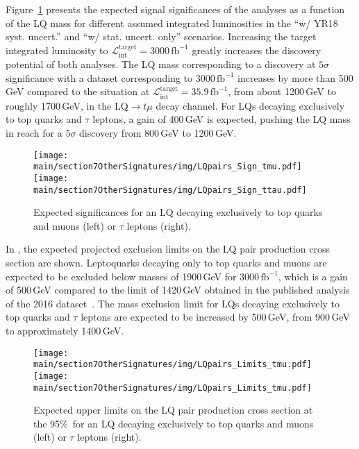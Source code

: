 Figure~\ref{fig:LQpairs:significances} presents the expected signal significances of the analyses as a function of the LQ mass for different assumed integrated luminosities in the ``w/ YR18 syst. uncert.'' and ``w/ stat. uncert. only'' scenarios. Increasing the target integrated luminosity to $\mathcal{L}_{\text{int}}^{\text{target}} = 3000\,\mathrm{fb}^{-1}$ greatly increases the discovery potential of both analyses. The LQ mass corresponding to a discovery at $5\sigma$ significance with a dataset corresponding to $3000\,\mathrm{fb}^{-1}$ increases by more than 500\,GeV compared to the situation at $\mathcal{L}_{\text{int}}^{\text{target}} = 35.9\,\mathrm{fb}^{-1}$, from about 1200\,GeV to roughly 1700\,GeV, in the $\text{LQ}\rightarrow t\mu$ decay channel. For LQs decaying exclusively to top quarks and $\tau$ leptons, a gain of 400\,GeV is expected, pushing the LQ mass in reach for a $5\sigma$ discovery from 800\,GeV to 1200\,GeV. 

\begin{figure}[t]
\centering
\texttt{[image: \\main/section7OtherSignatures/img/LQpairs\_Sign\_tmu.pdf]}
\texttt{[image: \\main/section7OtherSignatures/img/LQpairs\_Sign\_ttau.pdf]}
\caption{Expected significances for an LQ decaying exclusively to top quarks and muons (left) or $\tau$ leptons (right).}
\label{fig:LQpairs:significances}
\end{figure}

In , the expected projected exclusion limits on the LQ pair production cross section are shown. Leptoquarks decaying only to top quarks and muons are expected to be excluded below masses of 1900\,GeV for $3000\,\mathrm{fb}^{-1}$, which is a gain of 500\,GeV compared to the limit of 1420\,GeV obtained in the published analysis of the 2016 dataset~\cite{Sirunyan:2018ruf}. The mass exclusion limit for LQs decaying exclusively to top quarks and $\tau$ leptons are expected to be increased by 500\,GeV, from 900\,GeV to approximately 1400\,GeV.

\begin{figure}[t]
\centering
\texttt{[image: \\main/section7OtherSignatures/img/LQpairs\_Limits\_tmu.pdf]}
\texttt{[image: \\main/section7OtherSignatures/img/LQpairs\_Limits\_tmu.pdf]}
\caption{Expected upper limits on the LQ pair production cross section at the 95\%~\cl for an LQ decaying exclusively to top quarks and muons (left) or $\tau$ leptons (right).}
\label{fig:LQpairs:limits1d}
\end{figure}

